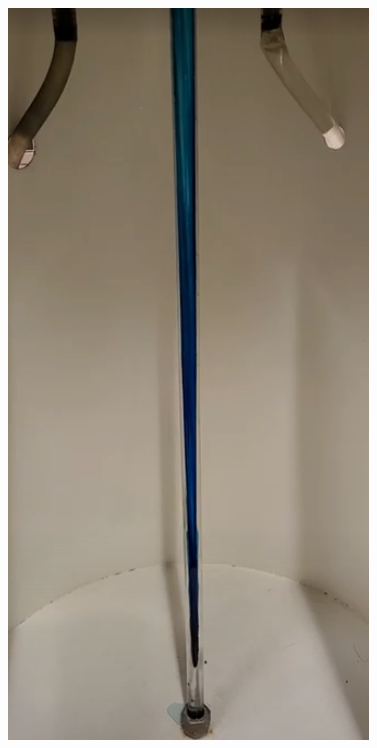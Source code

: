 \documentclass{article}
\begin{document}
\begin{center}
    \includegraphics*[scale=0.37]{fig3.png}
\end{center}
\newpage
\end{document}
